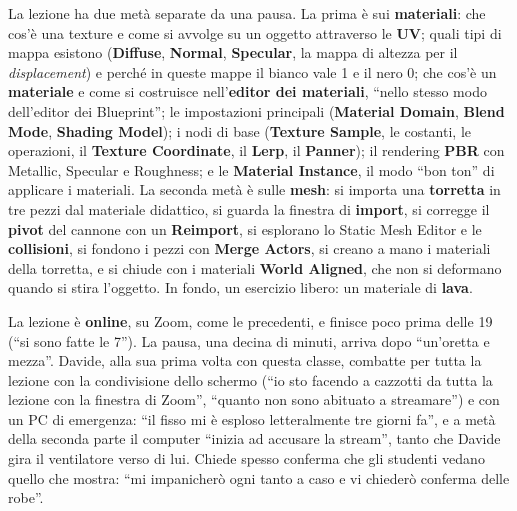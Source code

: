 La lezione ha due metà separate da una pausa. La prima è sui \textbf{materiali}: che
cos'è una texture e come si avvolge su un oggetto attraverso le \textbf{UV}; quali tipi
di mappa esistono (\textbf{Diffuse}, \textbf{Normal}, \textbf{Specular}, la mappa di
altezza per il \emph{displacement}) e perché in queste mappe il bianco vale 1 e il nero
0; che cos'è un \textbf{materiale} e come si costruisce nell'\textbf{editor dei
materiali}, ``nello stesso modo dell'editor dei Blueprint''; le impostazioni principali
(\textbf{Material Domain}, \textbf{Blend Mode}, \textbf{Shading Model}); i nodi di base
(\textbf{Texture Sample}, le costanti, le operazioni, il \textbf{Texture Coordinate},
il \textbf{Lerp}, il \textbf{Panner}); il rendering \textbf{PBR} con Metallic,
Specular e Roughness; e le \textbf{Material Instance}, il modo ``bon ton'' di applicare i
materiali. La seconda metà è sulle \textbf{mesh}: si importa una \textbf{torretta} in
tre pezzi dal materiale didattico, si guarda la finestra di \textbf{import}, si
corregge il \textbf{pivot} del cannone con un \textbf{Reimport}, si esplorano lo Static
Mesh Editor e le \textbf{collisioni}, si fondono i pezzi con \textbf{Merge Actors}, si
creano a mano i materiali della torretta, e si chiude con i materiali \textbf{World
Aligned}, che non si deformano quando si stira l'oggetto. In fondo, un esercizio libero:
un materiale di \textbf{lava}.

La lezione è \textbf{online}, su Zoom, come le precedenti, e finisce poco prima delle
19 (``si sono fatte le 7''). La pausa, una decina di minuti, arriva dopo ``un'oretta e
mezza''. Davide, alla sua prima volta con questa classe, combatte per tutta la lezione
con la condivisione dello schermo (``io sto facendo a cazzotti da tutta la lezione con
la finestra di Zoom'', ``quanto non sono abituato a streamare'') e con un PC di
emergenza: ``il fisso mi è esploso letteralmente tre giorni fa'', e a metà della seconda
parte il computer ``inizia ad accusare la stream'', tanto che Davide gira il
ventilatore verso di lui. Chiede spesso conferma che gli studenti vedano quello che
mostra: ``mi impanicherò ogni tanto a caso e vi chiederò conferma delle robe''.

